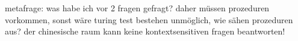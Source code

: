 \documentclass[a4paper, emulatestandardclasses, 12pt]{scrartcl}
\begin{document}
\begin{onehalfspace}
metafrage: was habe ich vor 2 fragen gefragt? daher müssen prozeduren vorkommen, sonst wäre turing test bestehen unmöglich, wie sähen prozeduren aus? der chinesische raum kann keine kontextsensitiven fragen beantworten! 


 
 

\noindent 




\end{onehalfspace}
\end{document}
